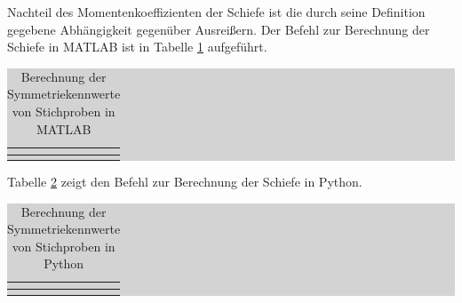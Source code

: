 \noindent Nachteil des Momentenkoeffizienten der Schiefe ist die durch seine Definition gegebene Abh\"{a}ngigkeit gegen\"{u}ber Ausrei{\ss}ern. Der Befehl zur Berechnung der Schiefe in MATLAB ist in Tabelle \ref{tab:threesixteen} aufgef\"{u}hrt.

\begin{table}[H]
\setlength{\arrayrulewidth}{.1em}
\caption{Berechnung der Symmetriekennwerte von Stichproben in MATLAB}
\setlength{\fboxsep}{0pt}%
\colorbox{lightgray}{%
%
\begin{tabular}{| c | c |}
\hline
\parbox[c][0.3in][c]{3.3in}{\smallskip\centering\textbf{\selectfont{Symmetriekennwert}}} & 
\parbox[c][0.3in][c]{3.3in}{\smallskip\centering\textbf{\selectfont{MATLAB-Befehl}}}\\ \hline

\parbox[c][0.3in][c]{3.3in}{\centering{}\selectfont{Momentenkoeffizientder Schiefe}} & 
\parbox[c][0.3in][c]{3.3in}{\centering{}\selectfont{Rechtsschiefe skewness(x)}}\\ \hline

\end{tabular}%
}
\label{tab:threesixteen}
\end{table}

\noindent Tabelle \ref{tab:threeseventeen} zeigt den Befehl zur Berechnung der Schiefe in Python.

\begin{table}[H]
\setlength{\arrayrulewidth}{.1em}
\caption{Berechnung der Symmetriekennwerte von Stichproben in Python}
\setlength{\fboxsep}{0pt}%
\colorbox{lightgray}{%
%
\begin{tabular}{| c | c |}
\hline
\parbox[c][0.3in][c]{3.3in}{\smallskip\centering\textbf{\selectfont{Symmetriekennwert}}} & 
\parbox[c][0.3in][c]{3.3in}{\smallskip\centering\textbf{\selectfont{Python-Befehl}}}\\ \hline

\parbox[c][0.3in][c]{3.3in}{\centering{}\selectfont{Momentenkoeffizientder Schiefe}} & 
\parbox[c][0.3in][c]{3.3in}{\centering{}\selectfont{scipy.stats.skew}}\\ \hline

\end{tabular}%
}
\label{tab:threeseventeen}
\end{table}

\clearpage 

